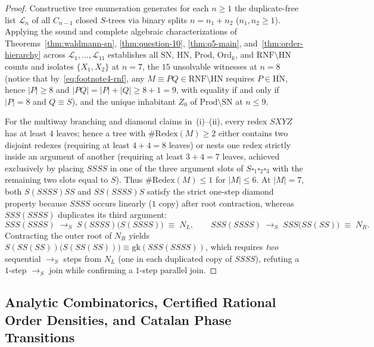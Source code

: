 \documentclass[11pt,reqno]{amsart}
\numberwithin{equation}{section}
\theoremstyle{plain}
\theoremstyle{definition}
\theoremstyle{remark}
\newcommand{\RNF}{\mathrm{RNF}}
\newcommand{\SN}{\mathrm{SN}}
\newcommand{\HN}{\mathrm{HN}}
\newcommand{\Prod}{\mathrm{Prod}}
\newcommand{\redS}{\to_S}
\begin{document}
\begin{proof}
Constructive tree enumeration generates for each $n \ge 1$ the duplicate-free list $\mathcal{L}_n$ of all $C_{n-1}$ closed $S$-trees via binary splits $n = n_1 + n_2$ ($n_1, n_2 \ge 1$). Applying the sound and complete algebraic characterizations of Theorems~\ref{thm:waldmann-sn}, \ref{thm:question-10}, \ref{thm:q5-main}, and~\ref{thm:order-hierarchy} across $\mathcal{L}_1, \dots, \mathcal{L}_{11}$ establishes all $\SN$, $\HN$, $\Prod$, $\mathrm{Ord}_k$, and $\RNF \setminus \HN$ counts and isolates $\{X_1, X_2\}$ at $n = 7$, the $15$ unsolvable witnesses at $n = 8$ (notice that by~\eqref{eq:footnote4-rnf}, any $M \equiv P Q \in \RNF \setminus \HN$ requires $P \in \overline{\HN}$, hence $|P| \ge 8$ and $|P Q| = |P| + |Q| \ge 8 + 1 = 9$, with equality if and only if $|P| = 8$ and $Q \equiv S$), and the unique inhabitant $Z_0$ of $\Prod \setminus \SN$ at $n \le 9$.

For the multiway branching and diamond claims in~(i)--(ii), every redex $S X Y Z$ has at least $4$ leaves; hence a tree with $\#\mathrm{Redex}(M) \ge 2$ either contains two disjoint redexes (requiring at least $4 + 4 = 8$ leaves) or nests one redex strictly inside an argument of another (requiring at least $3 + 4 = 7$ leaves, achieved exclusively by placing $S S S S$ in one of the three argument slots of $S \square_1 \square_2 \square_3$ with the remaining two slots equal to $S$). Thus $\#\mathrm{Redex}(M) \le 1$ for $|M| \le 6$. At $|M| = 7$, both $S(S S S S)S S$ and $S S (S S S S) S$ satisfy the strict one-step diamond property because $S S S S$ occurs linearly ($1$ copy) after root contraction, whereas $S S S (S S S S)$ duplicates its third argument:
\[
S S S (S S S S) \;\longrightarrow_S\; S(S S S S)\bigl(S(S S S S)\bigr) \;\equiv\; N_L,
\qquad
S S S (S S S S) \;\longrightarrow_S\; S S S \bigl(S S (S S)\bigr) \;\equiv\; N_R.
\]
Contracting the outer root of $N_R$ yields $S(S S (S S))\bigl(S(S S (S S))\bigr) \equiv \mathrm{gk}(S S S (S S S S))$, which requires \emph{two} sequential $\redS$ steps from $N_L$ (one in each duplicated copy of $S S S S$), refuting a $1$-step $\redS$ join while confirming a $1$-step parallel join.
\end{proof}

\subsection{Analytic Combinatorics, Certified Rational Order Densities, and Catalan Phase Transitions}
\label{subsec:analytic-combinatorics}
\end{document}
